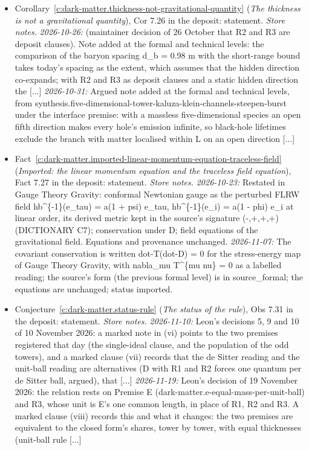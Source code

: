 \documentclass[11pt]{article}
\theoremstyle{definition}
\theoremstyle{plain}
\begin{document}
\begin{itemize}
\item Corollary~\ref{c:dark-matter.thickness-not-gravitational-quantity} (\emph{The thickness is not a gravitational quantity}), Cor 7.26 in the deposit: statement. \emph{Store notes.} \emph{2026-10-26:} (maintainer decision of 26 October that R2 and R3 are deposit clauses). Note added at the formal and technical levels: the comparison of the baryon spacing d\_b = 0.98 m with the short-range bound takes today's spacing as the extent, which assumes that the hidden direction co-expands; with R2 and R3 as deposit clauses and a static hidden direction the [...] \emph{2026-10-31:} Argued note added at the formal and technical levels, from synthesis.five-dimensional-tower-kaluza-klein-channels-steepen-burst under the interface premise: with a massless five-dimensional species an open fifth direction makes every hole's emission infinite, so black-hole lifetimes exclude the branch with matter localised within L on an open direction [...]
\item Fact~\ref{c:dark-matter.imported-linear-momentum-equation-traceless-field} (\emph{Imported: the linear momentum equation and the traceless field equation}), Fact 7.27 in the deposit: statement. \emph{Store notes.} \emph{2026-10-23:} Restated in Gauge Theory Gravity: conformal Newtonian gauge as the perturbed FLRW field hb\^{}\{-1\}(e\_tau) = a(1 + psi) e\_tau, hb\^{}\{-1\}(e\_i) = a(1 - phi) e\_i at linear order, its derived metric kept in the source's signature (-,+,+,+) (DICTIONARY C7); conservation under D; field equations of the gravitational field. Equations and provenance unchanged. \emph{2026-11-07:} The covariant conservation is written dot-T(dot-D) = 0 for the stress-energy map of Gauge Theory Gravity, with nabla\_mu T\^{}\{mu nu\} = 0 as a labelled reading; the source's form (the previous formal level) is in source\_formal; the equations are unchanged; status imported.
\item Conjecture~\ref{c:dark-matter.status-rule} (\emph{The status of the rule}), Obs 7.31 in the deposit: statement. \emph{Store notes.} \emph{2026-11-10:} Leon's decisions 5, 9 and 10 of 10 November 2026: a marked note in (vi) points to the two premises registered that day (the single-ideal clause, and the population of the odd towers), and a marked clause (vii) records that the de Sitter reading and the unit-ball reading are alternatives (D with R1 and R2 forces one quantum per de Sitter ball, argued), that [...] \emph{2026-11-19:} Leon's decision of 19 November 2026: the relation rests on Premise E (dark-matter.e-equal-mass-per-unit-ball) and R3, whose unit is E's one common length, in place of R1, R2 and R3. A marked clause (viii) records this and what it changes: the two premises are equivalent to the closed form's shares, tower by tower, with equal thicknesses (unit-ball rule [...]

\end{itemize}
\end{document}
